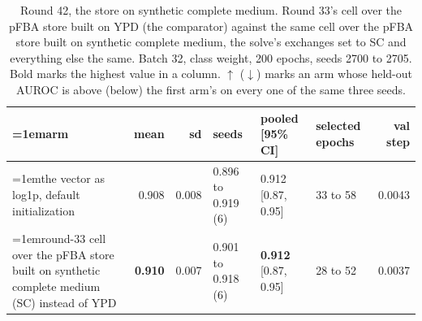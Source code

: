 \begin{table}[H]
  \centering
  \scriptsize
  \setlength{\tabcolsep}{2.5pt}
  \caption[Round 42, the store on synthetic complete medium]{Round 42, the store on synthetic complete medium. Round 33's cell over the pFBA store built on YPD (the comparator) against the same cell over the pFBA store built on synthetic complete medium, the solve's exchanges set to SC and everything else the same. Batch 32, class weight, 200 epochs, seeds 2700 to 2705. Bold marks the highest value in a column. $\uparrow$ ($\downarrow$) marks an arm whose held-out AUROC is above (below) the first arm's on every one of the same three seeds.}
  \label{tab:w58}
  \begin{tabular}{@{}>{\raggedright\hangindent=1em\hangafter=1\arraybackslash}p{84.4mm}rrlllr@{}}
    \hline
    arm & mean & sd & seeds & pooled [95\% CI] & selected epochs & val step \\
    \hline
    the vector as log1p, default initialization & 0.908 & 0.008 & 0.896 to 0.919 (6) & 0.912 [0.87, 0.95] & 33 to 58 & 0.0043 \\
    round-33 cell over the pFBA store built on synthetic complete medium (SC) instead of YPD & \textbf{0.910} & 0.007 & 0.901 to 0.918 (6) & \textbf{0.912} [0.87, 0.95] & 28 to 52 & 0.0037 \\
    \hline
  \end{tabular}
\end{table}

